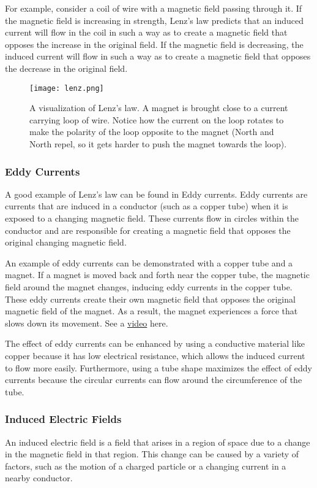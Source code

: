 \documentclass[12pt]{article}
\begin{document}
For example, consider a coil of wire with a magnetic field passing through it. If the magnetic field is increasing in strength, Lenz's law predicts that an induced current will flow in the coil in such a way as to create a magnetic field that opposes the increase in the original field. If the magnetic field is decreasing, the induced current will flow in such a way as to create a magnetic field that opposes the decrease in the original field.
    \begin{figure}[H]
  \centering
      \texttt{[image: lenz.png]}
      \caption{A visualization of Lenz's law. A magnet is brought close to a current carrying loop of wire. Notice how the current on the loop rotates to make the polarity of the loop opposite to the magnet (North and North repel, so it gets harder to push the magnet towards the loop).}
  \end{figure}
  \subsubsection{Eddy Currents}
  A good example of Lenz's law can be found in Eddy currents. Eddy currents are currents that are induced in a conductor (such as a copper tube) when it is exposed to a changing magnetic field. These currents flow in circles within the conductor and are responsible for creating a magnetic field that opposes the original changing magnetic field. 

An example of eddy currents can be demonstrated with a copper tube and a magnet. If a magnet is moved back and forth near the copper tube, the magnetic field around the magnet changes, inducing eddy currents in the copper tube. These eddy currents create their own magnetic field that opposes the original magnetic field of the magnet. As a result, the magnet experiences a force that slows down its movement. See a \href{https://youtu.be/H31K9qcmeMU}{video} here. 

The effect of eddy currents can be enhanced by using a conductive material like copper because it has low electrical resistance, which allows the induced current to flow more easily. Furthermore, using a tube shape maximizes the effect of eddy currents because the circular currents can flow around the circumference of the tube.
\subsubsection{Induced Electric Fields}
An induced electric field is a field that arises in a region of space due to a change in the magnetic field in that region. This change can be caused by a variety of factors, such as the motion of a charged particle or a changing current in a nearby conductor.
\end{document}
